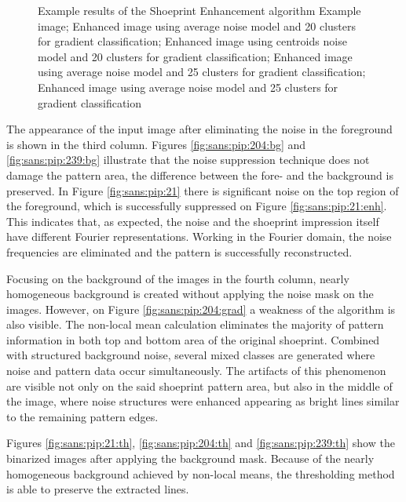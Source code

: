 \documentclass[draft,final]{vutinfth} %
\begin{document}
{\begin{figure}[H]
\caption{Example results of the Shoeprint Enhancement algorithm
				 Example image;  Enhanced image using average noise model and 20 clusters for gradient classification;  Enhanced image using centroids noise model and 20 clusters for gradient classification;  Enhanced image using average noise model and 25 clusters for gradient classification;  Enhanced image using average noise model and 25 clusters for gradient classification}
\label{fig:sans:res2}

\end{figure}
}

\par
The appearance of the input image after eliminating the noise in the foreground is shown in the third column.
Figures  \ref{fig:sans:pip:204:bg} and \ref{fig:sans:pip:239:bg} illustrate that the noise suppression technique does not damage the pattern area, the difference between the fore- and the background is preserved.
In Figure \ref{fig:sans:pip:21} there is significant noise on the top region of the foreground, which is successfully suppressed on Figure \ref{fig:sans:pip:21:enh}.
This indicates that, as expected, the noise and the shoeprint impression itself have different Fourier representations.
Working in the Fourier domain, the noise frequencies are eliminated and the pattern is successfully reconstructed.
\par
Focusing on the background of the images in the fourth column, nearly homogeneous background is created without applying the noise mask on the images.
However, on Figure \ref{fig:sans:pip:204:grad} a weakness of the algorithm is also visible.
The non-local mean calculation eliminates the majority of pattern information in both top and bottom area of the original shoeprint.
Combined with structured background noise, several mixed classes are generated where noise and pattern data occur simultaneously.
The artifacts of this phenomenon are visible not only on the said shoeprint pattern area, but also in the middle of the image, where noise structures were enhanced appearing as bright lines similar to the remaining pattern edges.
\par
Figures \ref{fig:sans:pip:21:th}, \ref{fig:sans:pip:204:th} and \ref{fig:sans:pip:239:th} show the binarized images after applying the background mask.
Because of the nearly homogeneous background achieved by non-local means, the thresholding method is able to preserve the extracted lines.
\end{document}
